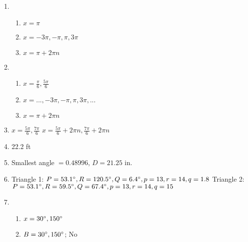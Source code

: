 \documentclass{article}
\begin{document}
\begin{enumerate}
\item

	\begin{enumerate}
	
	\item $x = \pi$
	
	\item $x = -3\pi, -\pi, \pi, 3\pi$
	
	\item $x = \pi + 2\pi n$
	
	\end{enumerate}
	
\item

	\begin{enumerate}
	
	\item $x = \frac{\pi}{6}, \frac{5\pi}{6}$
	
	\item $x = ..., -3\pi, -\pi, \pi, 3\pi, ...$
	
	\item $x = \pi + 2\pi n$
	
	\end{enumerate}
	
\item $x = \frac{5\pi}{6}, \frac{7\pi}{6}$ \newline
$x = \frac{5\pi}{6} + 2\pi n, \frac{7\pi}{6} + 2\pi n$

\item 22.2 ft

\item Smallest angle $= 0.48996$, $D = 21.25$ in.

\item Triangle 1: $P = 53.1\degree, R = 120.5\degree, Q = 6.4\degree, p = 13, r = 14, q = 1.8$ \newline
	Triangle 2: $P = 53.1\degree, R = 59.5\degree, Q = 67.4\degree, p = 13, r = 14, q = 15$
	
\item

	\begin{enumerate}
	
	\item $x = 30\degree, 150\degree$
	
	\item $B = 30\degree, 150\degree$; No
	
	\end{enumerate}

\end{enumerate}
\end{document}
